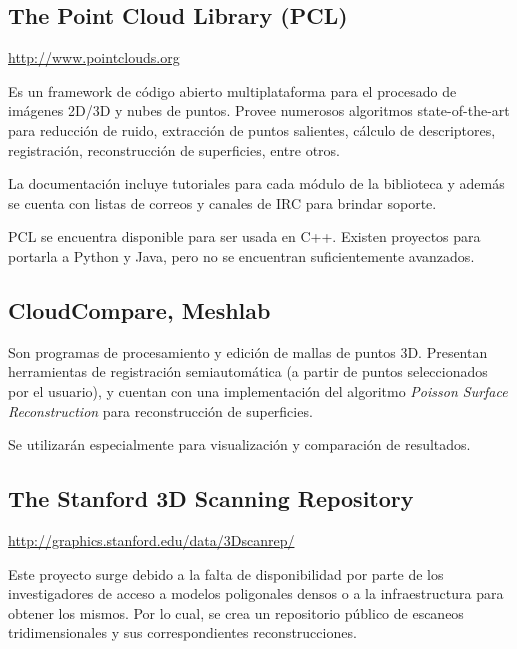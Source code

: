 \documentclass{pfc}
\begin{document}

		\subsection{The Point Cloud Library (PCL)}
			\url{http://www.pointclouds.org}

			Es un framework de código abierto multiplataforma para el procesado de imágenes 2D/3D y nubes de puntos.
			Provee numerosos algoritmos state-of-the-art %
			para reducción de ruido, extracción de puntos salientes,
			cálculo de descriptores, registración,
			reconstrucción de superficies, entre otros.

			La documentación incluye tutoriales para cada módulo de la biblioteca
			y además se cuenta con listas de correos
			y canales de IRC para brindar soporte.


			PCL se encuentra disponible para ser usada en C++.
			Existen proyectos para portarla a Python y Java,
			pero no se encuentran suficientemente avanzados.

		\subsection{CloudCompare, Meshlab}
			Son programas de procesamiento y edición de mallas de puntos 3D.
			Presentan herramientas de registración semiautomática (a partir de
			puntos seleccionados por el usuario), y cuentan con una
			implementación del algoritmo \emph{Poisson Surface Reconstruction}
			para reconstrucción de superficies.

			Se utilizarán especialmente para visualización
			y comparación de resultados.

		\subsection{The Stanford 3D Scanning Repository}
			\url{http://graphics.stanford.edu/data/3Dscanrep/}

			Este proyecto surge debido a la falta de disponibilidad
			por parte de los investigadores
			de acceso a modelos poligonales densos
				o a la infraestructura para obtener los mismos.
			Por lo cual, se crea un repositorio público de
			escaneos tridimensionales y sus correspondientes reconstrucciones.
\end{document}
